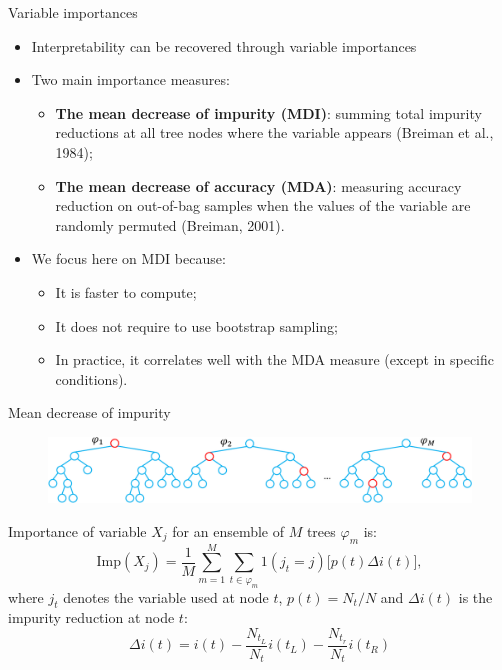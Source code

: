 \documentclass{beamer}
\begin{document}
\begin{frame}{Variable importances}

\begin{itemize}
\item Interpretability can be recovered through {\color{blue}variable importances}

\bigskip

\item Two main importance measures:
    \begin{itemize}
    \item {\bf The mean decrease of impurity (MDI)}: summing total impurity reductions
      at all tree nodes where the variable appears {\scriptsize (Breiman et al., 1984)};
    \item {\bf The mean decrease of accuracy (MDA)}: measuring
      accuracy reduction on out-of-bag samples when the values of the
      variable are randomly permuted {\scriptsize (Breiman, 2001)}.
    \end{itemize}

\bigskip

\item We focus here on MDI because:
\begin{itemize}
\item It is faster to compute;
\item It does not require to use bootstrap sampling;
\item In practice, it correlates well with the MDA
  measure (except in specific conditions).
\end{itemize}

\end{itemize}
\end{frame}

\begin{frame}{Mean decrease of impurity}

\begin{figure}
    \includegraphics[scale=0.4]{./figures/mdi.pdf}
\end{figure}

Importance of variable $X_j$ for an ensemble of $M$ trees $\varphi_{m}$ is:
\begin{equation*}
\text{Imp}(X_j) = \frac{1}{M} \sum_{m=1}^M \sum_{t \in \varphi_{m}} 1(j_t = j) \Big[ p(t) \Delta i(t) \Big],
\end{equation*}
where $j_t$ denotes the variable used at node $t$, $p(t)=N_t/N$ and $\Delta i(t)$ is the impurity reduction at node $t$:
\begin{equation*}
\Delta i(t) = i(t) - \frac{N_{t_L}}{N_t} i(t_L) - \frac{N_{t_r}}{N_t} i(t_R)
\end{equation*}

\end{frame}
\end{document}
